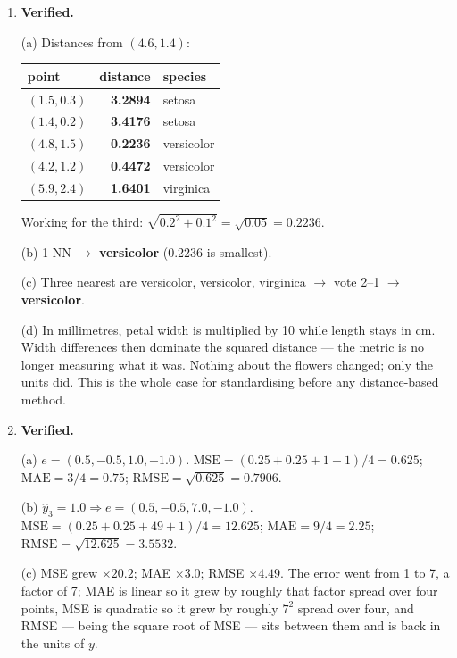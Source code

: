 \documentclass[11pt,a4paper]{article}
\newcommand{\A}[1]{\item[\textbf{#1}]}
\begin{document}
\begin{enumerate}[leftmargin=1.9cm]

\A{U1.14} \textbf{Verified.}
\begin{answerbox}
(a) Distances from $(4.6, 1.4)$:
\begin{center}\begin{tabular}{@{}lrl@{}}\toprule
point & distance & species\\ \midrule
$(1.5,0.3)$ & \textbf{3.2894} & setosa\\
$(1.4,0.2)$ & \textbf{3.4176} & setosa\\
$(4.8,1.5)$ & \textbf{0.2236} & versicolor\\
$(4.2,1.2)$ & \textbf{0.4472} & versicolor\\
$(5.9,2.4)$ & \textbf{1.6401} & virginica\\
\bottomrule\end{tabular}\end{center}
Working for the third: $\sqrt{0.2^2 + 0.1^2} = \sqrt{0.05} = 0.2236$.

(b) 1-NN $\to$ \textbf{versicolor} (0.2236 is smallest).

(c) Three nearest are versicolor, versicolor, virginica $\to$ vote 2--1 $\to$
\textbf{versicolor}.

(d) In millimetres, petal width is multiplied by 10 while length stays in cm.
Width differences then dominate the squared distance --- the metric is no
longer measuring what it was. Nothing about the flowers changed; only the
units did. This is the whole case for standardising before any distance-based
method.
\end{answerbox}

\A{U1.15} \textbf{Verified.}
\begin{answerbox}
(a) $e = (0.5, -0.5, 1.0, -1.0)$. $\text{MSE} = (0.25+0.25+1+1)/4 =
\mathbf{0.625}$; $\text{MAE} = 3/4 = \mathbf{0.75}$;
$\text{RMSE} = \sqrt{0.625} = \mathbf{0.7906}$.

(b) $\hat y_3 = 1.0 \Rightarrow e = (0.5, -0.5, 7.0, -1.0)$.
$\text{MSE} = (0.25+0.25+49+1)/4 = \mathbf{12.625}$;
$\text{MAE} = 9/4 = \mathbf{2.25}$;
$\text{RMSE} = \sqrt{12.625} = \mathbf{3.5532}$.

(c) MSE grew $\times 20.2$; MAE $\times 3.0$; RMSE $\times 4.49$. The error
went from 1 to 7, a factor of 7; MAE is linear so it grew by roughly that
factor spread over four points, MSE is quadratic so it grew by roughly $7^2$
spread over four, and RMSE --- being the square root of MSE --- sits between
them and is back in the units of $y$.
\end{answerbox}


\end{enumerate}
\end{document}
